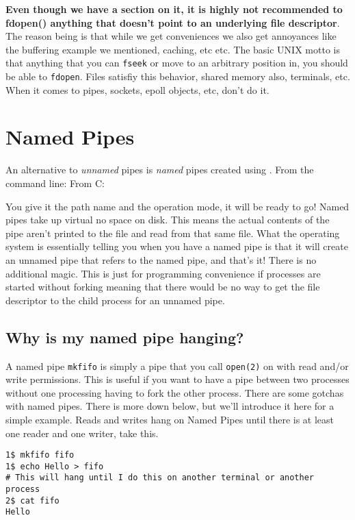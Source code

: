 \textbf{Even though we have a section on it, it is highly not recommended to fdopen() anything that doesn't point to an underlying file descriptor}. The reason being is that while we get conveniences we also get annoyances like the buffering example we mentioned, caching, etc etc.
The basic UNIX motto is that anything that you can \texttt{fseek} or move to an arbitrary position in, you should be able to \texttt{fdopen}. Files satisfiy this behavior, shared memory also, terminals, etc.
When it comes to pipes, sockets, epoll objects, etc, don't do it.

\section{Named Pipes}

An alternative to \emph{unnamed} pipes is \emph{named} pipes created using .
From the command line:  From C: 

You give it the path name and the operation mode, it will be ready to go!
Named pipes take up virtual no space on disk.
This means the actual contents of the pipe aren't printed to the file and read from that same file.
What the operating system is essentially telling you when you have a named pipe is that it will create an unnamed pipe that refers to the named pipe, and that's it!
There is no additional magic.
This is just for programming convenience if processes are started without forking meaning that there would be no way to get the file descriptor to the child process for an unnamed pipe.

\subsection{Why is my named pipe hanging?}

A named pipe \texttt{mkfifo} is simply a pipe that you call \texttt{open(2)} on with read and/or write permissions.
This is useful if you want to have a pipe between two processes without one processing having to fork the other process.
There are some gotchas with named pipes.
There is more down below, but we'll introduce it here for a simple example.
Reads and writes hang on Named Pipes until there is at least one reader and one writer, take this.

\begin{verbatim}
1$ mkfifo fifo
1$ echo Hello > fifo
# This will hang until I do this on another terminal or another process
2$ cat fifo
Hello
\end{verbatim}


